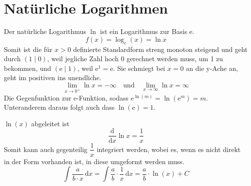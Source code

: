 \documentclass{article}
\begin{document}
\section{Natürliche Logarithmen} 
\begin{minipage}{\dimexpr\textwidth-5cm}  
Der natürliche Logarithmus $\ln$ ist ein Logarithmus zur Basis $\mathrm{e}$.
\[
 f(x) = \log_e{(x)} = \ln{x}
\] 
Somit ist die für $x>0$ definierte Standardform streng monoton steigend und geht durch ${(1 \mid 0)}$, weil jegliche Zahl hoch 0 gerechnet werden muss, um 1 zu bekommen, und $(\mathrm{e} \mid 1)$, weil $\mathrm{e}^1=\mathrm{e}$.
Sie schmiegt bei $x=0$ an die y-Ache an, geht im positiven ins unendliche.
\[
 \lim_{x \to 0^+} \ln x = -\infty
 \quad \text{und} \quad
 \lim_{x \to \infty} \ln x= \infty
\] 
Die Gegenfunktion zur e-Funktion, sodass $\mathrm{e}^{\ln(m)}=\ln{(\mathrm{e}^m)}=m$. Unteranderem daraus folgt auch dass $\ln(\mathrm{e})=1$.
 
\end{minipage}
\hfill
\begin{minipage}{5cm}  
\centering
\end{minipage} 
$\ln{(x)}$ abgeleitet ist 
\[
 \frac{\mathrm{d}}{\mathrm{d}x} \ln{x} = \frac{1}{x} 
\]
Somit kann auch gegenteilig $\dfrac{1}{x}$ integriert werden, wobei es, wenn es nicht direkt in der Form vorhanden ist, in diese umgeformt werden muss.
\[
 \int \frac{a}{b \cdot x} \,\mathrm{d}x =
 \int \frac{a}{b} \cdot \frac{1}{x} \,\mathrm{d}x =
 \frac{a}{b} \cdot \ln(x) + C
\] 
 
\end{document}
